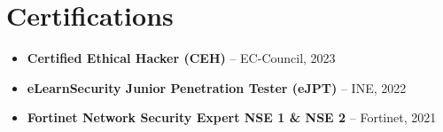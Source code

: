 \documentclass[letterpaper,11pt]{article}
\begin{document}
\section{Certifications}
\begin{itemize}[leftmargin=0.15in, label={}]
\small{\item{
\begin{itemize}
\item \textbf{Certified Ethical Hacker (CEH)} -- EC-Council, 2023
\item \textbf{eLearnSecurity Junior Penetration Tester (eJPT)} -- INE, 2022
\item \textbf{Fortinet Network Security Expert NSE 1 \& NSE 2} -- Fortinet, 2021
\end{itemize}
}}
\end{itemize}
\end{document}
